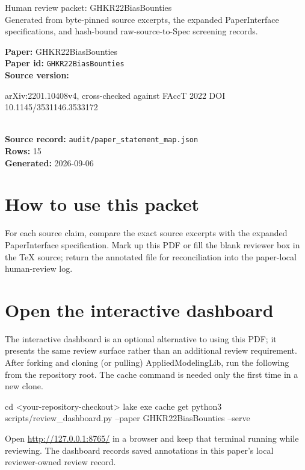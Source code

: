 \documentclass[10pt]{article}
\begin{document}
\fontsize{9}{10}\selectfont

\begin{center}
{\LARGE Human review packet: GHKR22BiasBounties}\\[0.35em]
\small Generated from byte-pinned source excerpts, the expanded PaperInterface
specifications, and hash-bound raw-source-to-Spec screening records.
\end{center}

\noindent\textbf{Paper:} GHKR22BiasBounties\\
\textbf{Paper id:} \texttt{GHKR22BiasBounties}\\
\textbf{Source version:} \parbox[t]{0.76\linewidth}{\raggedright arXiv:2201.10408v4, cross-checked against FAccT 2022 DOI 10.1145/3531146.3533172}\\
\textbf{Source record:} \texttt{audit/paper\_statement\_map.json}\\
\textbf{Rows:} 15\\
\textbf{Generated:} 2026-09-06





\section*{How to use this packet}
For each source claim, compare the exact source excerpts with the expanded
PaperInterface specification. Mark up this PDF or fill the blank reviewer box in the TeX source;
return the annotated file for reconciliation into the paper-local human-review
log.

\section*{Open the interactive dashboard}
The interactive dashboard is an optional alternative to using this PDF; it
presents the same review surface rather than an additional review requirement.
After forking and cloning (or pulling) AppliedModelingLib, run the following from the
repository root. The cache command is needed only the first time in a new clone.
\begin{ReviewVerbatim}
cd <your-repository-checkout>
lake exe cache get
python3 scripts/review_dashboard.py --paper GHKR22BiasBounties --serve
\end{ReviewVerbatim}
Open \url{http://127.0.0.1:8765/} in a browser and keep that terminal running
while reviewing. The dashboard records saved annotations in this paper's local
reviewer-owned review record.
\end{document}
